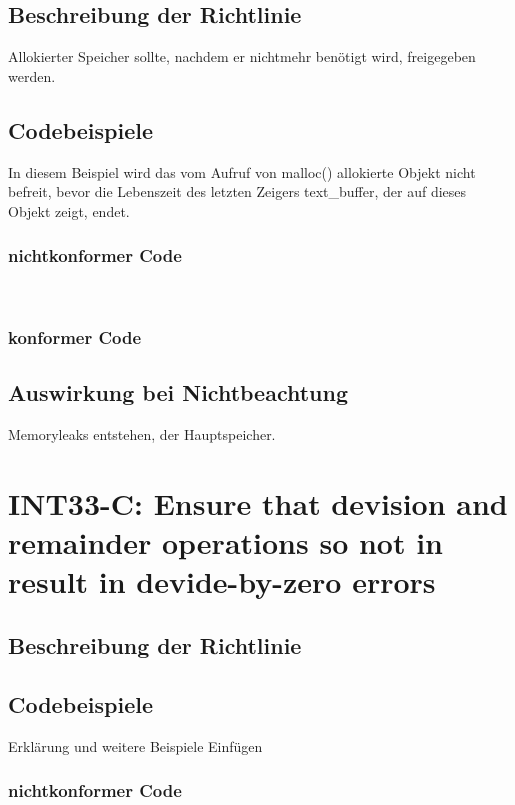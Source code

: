 \documentclass[12pt]{article}
\begin{document}
\subsection{Beschreibung der Richtlinie}
Allokierter Speicher sollte, nachdem er nichtmehr ben\"otigt wird, freigegeben werden.
\subsection{Codebeispiele}
In diesem Beispiel wird das vom Aufruf von malloc() allokierte Objekt nicht befreit, bevor die Lebenszeit des letzten Zeigers text\_buffer, der auf dieses Objekt zeigt, endet.

\subsubsection{nichtkonformer Code}

~\\
\subsubsection{konformer Code}


\subsection{Auswirkung bei Nichtbeachtung}
Memoryleaks entstehen, der Hauptspeicher.


\newpage
\section{INT33-C: Ensure that devision and remainder operations so not in result in devide-by-zero errors}
\subsection{Beschreibung der Richtlinie}
\subsection{Codebeispiele}
Erkl\"arung und weitere Beispiele Einf\"ugen
\subsubsection{nichtkonformer Code}

\end{document}
